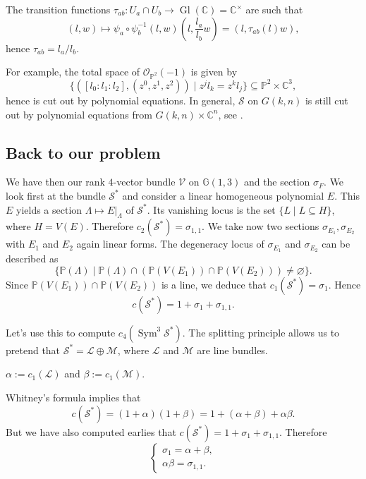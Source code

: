\documentclass[12pt,a4paper]{amsart}
\theoremstyle{plain}
\theoremstyle{definition}
\theoremstyle{remark}
\begin{document}
The transition functions $\tau_{ab} \colon U_{a} \cap U_{b} \to \operatorname{Gl}(\mathbb{C}) = \mathbb{C}^{\times}$ are such that
\[ (l,w) \mapsto \psi_{a} \circ \psi_{b}^{-1}(l,w)  \left(l, \frac{l_{a}}{l_{b}} w\right) = (l,\tau_{ab}(l)w), \]
hence $\tau_{ab} = l_{a}/l_{b}$.

For example, the total space of $\mathscr{O}_{\mathbb{P}^{2}}(-1)$ is given by
\[ \{ ([l_{0} : l_{1} : l_{2}] , (z^{0}, z^{1}, z^{2})) \mid z^{j}l_{k} = z^{k}l_{j} \} \subseteq \mathbb{P}^{2} \times \mathbb{C}^{3}, \]
hence is cut out by polynomial equations.
In general, $\mathscr{S}$ on $G(k,n)$ is still cut out by polynomial equations from $G(k,n) \times \mathbb{C}^{n}$, see \cite[\S 3.2.3]{eh16}.

\subsection{Back to our problem}

We have then our rank $4$-vector bundle $\mathscr{V}$ on $\mathbb{G}(1,3)$ and the section $\sigma_{F}$.
We look first at the bundle $\mathscr{S}^{*}$ and consider a linear homogeneous polynomial $E$.
This $E$ yields a section $\Lambda \mapsto E|_{\Lambda}$ of $\mathscr{S}^{*}$.
Its vanishing locus is the set $\{ L \mid L \subseteq H\}$, where $H = V(E)$.
Therefore $c_{2}(\mathscr{S}^{*}) = \sigma_{1,1}$.
We take now two sections $\sigma_{E_{1}}, \sigma_{E_{2}}$ with $E_{1}$ and $E_{2}$ again linear forms.
The degeneracy locus of $\sigma_{E_{1}}$ and $\sigma_{E_{2}}$ can be described as
\[ \{ \mathbb{P}(\Lambda) \mid \mathbb{P}(\Lambda) \cap (\mathbb{P}(V(E_{1})) \cap \mathbb{P}(V(E_{2}))) \neq \varnothing \}. \]
Since $\mathbb{P}(V(E_{1})) \cap \mathbb{P}(V(E_{2}))$ is a line, we deduce that $c_{1}(\mathscr{S}^{*}) = \sigma_{1}$.
Hence
\[ c(\mathscr{S}^{*}) = 1 + \sigma_{1} + \sigma_{1,1}. \]

Let's use this to compute $c_{4}(\operatorname{Sym}^{3}\mathscr{S}^{*})$.
The splitting principle allows us to pretend that $\mathscr{S}^{*} = \mathscr{L} \oplus \mathscr{M}$, where $\mathscr{L}$ and $\mathscr{M}$ are line bundles.

\underline{} $\alpha := c_{1}(\mathscr{L})$ and $\beta := c_{1}(\mathscr{M})$.

Whitney's formula implies that
\[ c(\mathscr{S}^{*}) = (1 + \alpha)(1 + \beta) = 1 + (\alpha + \beta) + \alpha\beta. \]
But we have also computed earlies that $c(\mathscr{S}^{*}) = 1 + \sigma_{1} + \sigma_{1,1}$.
Therefore
\[ \begin{cases} \sigma_{1} = \alpha + \beta, \\
  \alpha\beta = \sigma_{1,1}.
\end{cases} \]
\end{document}
